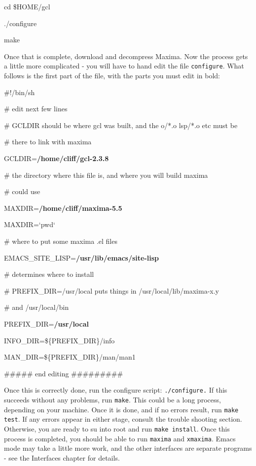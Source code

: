 \vspace{3ex}


cd \$HOME/gcl

./configure

make\vspace{3ex}


Once that is complete, download and decompress Maxima. Now the process
gets a little more complicated - you will have to hand edit the file
\texttt{configure}. What follows is the first part of the file, with
the parts you must edit in bold:

\vspace{3ex}%

\#!/bin/sh

\# edit next few lines 

\# GCLDIR should be where gcl was built, and the o/{*}.o lsp/{*}.o
etc must be

\# there to link with maxima

GCLDIR=\textbf{/home/cliff/gcl-2.3.8}

\# the directory where this file is, and where you will build maxima

\# could use

MAXDIR=\textbf{/home/cliff/maxima-5.5}

MAXDIR=`pwd`

\# where to put some maxima .el files

EMACS\_SITE\_LISP=\textbf{/usr/lib/emacs/site-lisp}

\# determines where to install

\# PREFIX\_DIR=/usr/local puts things in /usr/local/lib/maxima-x.y

\# and /usr/local/bin

PREFIX\_DIR=\textbf{/usr/local}

INFO\_DIR=\$\{PREFIX\_DIR\}/info

MAN\_DIR=\$\{PREFIX\_DIR\}/man/man1

\#\#\#\#\# end editing \#\#\#\#\#\#\#\#\#

\vspace{3ex}%

Once this is correctly done, run the configure script: \texttt{./configure.}
If this succeeds without any problems, run \texttt{make}. This could
be a long process, depending on your machine. Once it is done, and
if no errors result, run \texttt{make test}. If any errors appear
in either stage, consult the trouble shooting section. Otherwise,
you are ready to su into root and run \texttt{make install}. Once
this process is completed, you should be able to run \texttt{maxima}
and \texttt{xmaxima}. Emacs mode may take a little more work, and
the other interfaces are separate programs - see the Interfaces chapter
for details.


